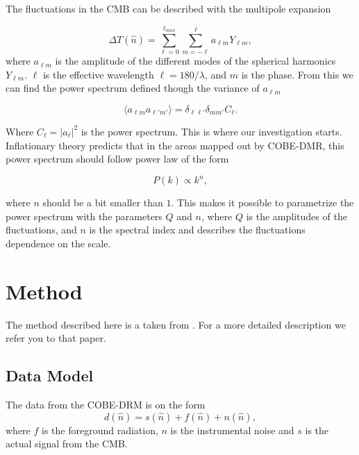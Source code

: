 \documentclass{emulateapj}
\begin{document}
The fluctuations in the CMB can be described with the multipole expansion

\begin{equation}
\Delta T(\hat{n}) = \sum_{\ell = 0}^{\ell_{max}}\sum_{m = -\ell}^\ell a_{\ell m}Y_{\ell m},
\end{equation}
where $a_{\ell m}$ is the amplitude of the different modes of the spherical harmonics $Y_{\ell m}$. $\ell$ is the effective wavelength $\ell = 180/\lambda$, and $m$ is the phase. From this we can find the power spectrum defined though the variance of $a_{\ell m}$

\begin{equation}
\langle a_{\ell m}a_{\ell'm'}\rangle = \delta_{\ell \ell '}\delta_{m m'}C_\ell.
\end{equation}

Where $C_\ell = |a_\ell|^2$ is the power spectrum. This is where our investigation starts. Inflationary theory predicts that in the areas mapped out by COBE-DMR, this power spectrum should follow power law of the form

\begin{equation}
P(k) \propto k^n,
\end{equation}

where $n$ should be a bit smaller than $1$. This makes it possible to parametrize the power spectrum with the parameters $Q$ and $n$, where $Q$ is the amplitudes of the fluctuations, and $n$ is the spectral index and describes the fluctuations dependence on the scale.




\section{Method}
The method described here is a taken from \cite{oppgave}. For a more detailed description we refer you to that paper.
\label{sec:method}

\subsection{Data Model}
The data from the COBE-DRM is on the form
\begin{equation}
d(\hat{n}) = s(\hat{n}) + f(\hat{n}) + n(\hat{n}),
\end{equation}
where $f$ is the foreground radiation, $n$ is the instrumental noise and $s$ is the actual signal from the CMB.
\end{document}
